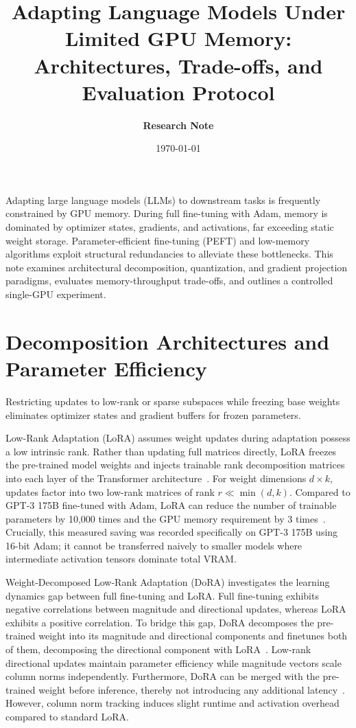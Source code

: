 \documentclass[11pt,a4paper]{article}
\title{\textbf{Adapting Language Models Under Limited GPU Memory:\\Architectures, Trade-offs, and Evaluation Protocol}}
\author{\textbf{Research Note}}
\date{\today}
\begin{document}
\maketitle

Adapting large language models (LLMs) to downstream tasks is frequently constrained by GPU memory. During full fine-tuning with Adam, memory is dominated by optimizer states, gradients, and activations, far exceeding static weight storage. Parameter-efficient fine-tuning (PEFT) and low-memory algorithms exploit structural redundancies to alleviate these bottlenecks. This note examines architectural decomposition, quantization, and gradient projection paradigms, evaluates memory-throughput trade-offs, and outlines a controlled single-GPU experiment.

\section{Decomposition Architectures and Parameter Efficiency}

Restricting updates to low-rank or sparse subspaces while freezing base weights eliminates optimizer states and gradient buffers for frozen parameters.

Low-Rank Adaptation (LoRA) assumes weight updates during adaptation possess a low intrinsic rank. Rather than updating full matrices directly, LoRA freezes the pre-trained model weights and injects trainable rank decomposition matrices into each layer of the Transformer architecture~\cite{hu2021lora}. For weight dimensions $d \times k$, updates factor into two low-rank matrices of rank $r \ll \min(d, k)$. Compared to GPT-3 175B fine-tuned with Adam, LoRA can reduce the number of trainable parameters by 10,000 times and the GPU memory requirement by 3 times~\cite{hu2021lora}. Crucially, this measured saving was recorded specifically on GPT-3 175B using 16-bit Adam; it cannot be transferred naively to smaller models where intermediate activation tensors dominate total VRAM.

Weight-Decomposed Low-Rank Adaptation (DoRA) investigates the learning dynamics gap between full fine-tuning and LoRA. Full fine-tuning exhibits negative correlations between magnitude and directional updates, whereas LoRA exhibits a positive correlation. To bridge this gap, DoRA decomposes the pre-trained weight into its magnitude and directional components and finetunes both of them, decomposing the directional component with LoRA~\cite{liu2024dora}. Low-rank directional updates maintain parameter efficiency while magnitude vectors scale column norms independently. Furthermore, DoRA can be merged with the pre-trained weight before inference, thereby not introducing any additional latency~\cite{liu2024dora}. However, column norm tracking induces slight runtime and activation overhead compared to standard LoRA.
\end{document}
